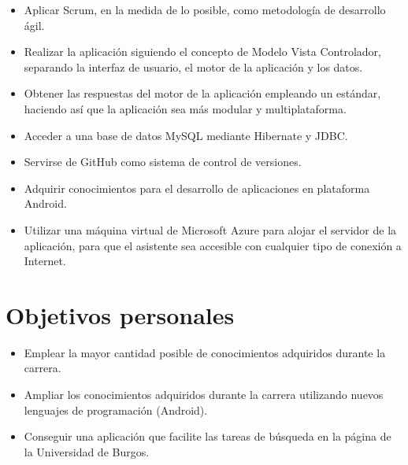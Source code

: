 \begin{itemize}
	\tightlist
	\item
	Aplicar Scrum, en la medida de lo posible, como metodología de desarrollo ágil.
	\item
	Realizar la aplicación siguiendo el concepto de Modelo Vista Controlador, separando la interfaz de usuario, el motor de la aplicación y los datos.
	\item
	Obtener las respuestas del motor de la aplicación empleando un estándar, haciendo así que la aplicación sea más modular y multiplataforma.
	\item
	Acceder a una base de datos MySQL mediante Hibernate y JDBC.
	\item
	Servirse de GitHub como sistema de control de versiones.
	\item
	Adquirir conocimientos para el desarrollo de aplicaciones en plataforma Android.
	\item 
	Utilizar una máquina virtual de Microsoft Azure para alojar el servidor de la aplicación, para que el asistente sea accesible con cualquier tipo de conexión a Internet.
	
\end{itemize}

\section{Objetivos personales}\label{objetivos-personales}

\begin{itemize}
	\tightlist
	\item
	Emplear la mayor cantidad posible de conocimientos adquiridos durante la carrera.
	\item
	Ampliar los conocimientos adquiridos durante la carrera utilizando nuevos lenguajes de programación (Android).
	\item 
	Conseguir una aplicación que facilite las tareas de búsqueda en la página de la Universidad de Burgos.
\end{itemize}
